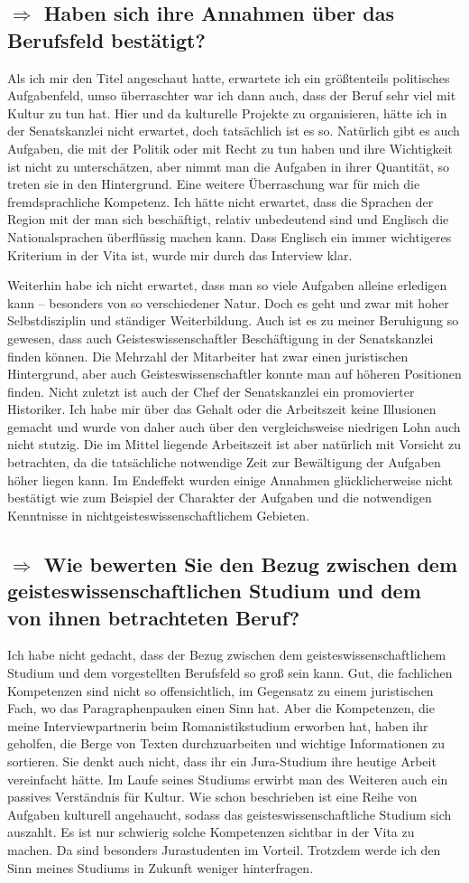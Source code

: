 \documentclass{../../sem_paper}
\newcommand\quest[1]{\subsection*{$\Rightarrow$ #1}}
\begin{document}
\quest{Haben sich ihre Annahmen über das Berufsfeld bestätigt?}
Als ich mir den Titel angeschaut hatte, erwartete ich ein größtenteils politisches Aufgabenfeld, umso überraschter war ich dann auch, dass der Beruf sehr viel mit Kultur zu tun hat. Hier und da kulturelle Projekte zu organisieren, hätte ich in der Senatskanzlei nicht erwartet, doch tatsächlich ist es so. Natürlich gibt es auch Aufgaben, die mit der Politik oder mit Recht zu tun haben und ihre Wichtigkeit ist nicht zu  unterschätzen, aber nimmt man die Aufgaben in ihrer Quantität, so treten sie in den Hintergrund.
Eine weitere Überraschung war für mich die fremdsprachliche Kompetenz. Ich hätte nicht erwartet, dass die Sprachen der Region mit der man sich beschäftigt, relativ unbedeutend sind und Englisch die Nationalsprachen überflüssig machen kann. Dass Englisch ein immer wichtigeres Kriterium in der Vita ist, wurde mir durch das Interview klar.

Weiterhin habe ich nicht erwartet, dass man so viele Aufgaben alleine erledigen kann -- besonders von so verschiedener Natur. Doch es geht und zwar mit hoher Selbstdisziplin und ständiger Weiterbildung. 
Auch ist es zu meiner Beruhigung so gewesen, dass auch Geisteswissenschaftler Beschäftigung in der Senatskanzlei finden können. Die Mehrzahl der Mitarbeiter hat zwar einen juristischen Hintergrund, aber auch Geisteswissenschaftler konnte man auf höheren Positionen finden. Nicht zuletzt ist auch der Chef der Senatskanzlei ein promovierter Historiker.
Ich habe mir über das Gehalt oder die Arbeitszeit keine Illusionen gemacht und wurde von daher auch über den vergleichsweise niedrigen Lohn auch  nicht stutzig. Die im Mittel liegende Arbeitszeit ist aber natürlich mit Vorsicht zu betrachten, da die tatsächliche notwendige Zeit zur Bewältigung der Aufgaben höher liegen kann.
Im Endeffekt wurden einige Annahmen glücklicherweise nicht bestätigt wie zum Beispiel der Charakter der Aufgaben und die notwendigen Kenntnisse in nichtgeisteswissenschaftlichem Gebieten.

\quest{Wie bewerten Sie den Bezug zwischen dem geisteswissenschaftlichen Studium und dem von ihnen betrachteten Beruf?}
Ich habe nicht gedacht, dass der Bezug zwischen dem geisteswissenschaftlichem Studium und dem vorgestellten Berufsfeld so groß sein kann. Gut, die fachlichen Kompetenzen sind nicht so offensichtlich, im Gegensatz zu einem juristischen Fach, wo das Paragraphenpauken einen Sinn hat. Aber die  Kompetenzen, die meine Interviewpartnerin beim Romanistikstudium erworben hat, haben ihr geholfen, die Berge von Texten durchzuarbeiten und wichtige Informationen zu sortieren. Sie denkt auch nicht, dass ihr ein Jura-Studium ihre heutige Arbeit vereinfacht hätte.
Im Laufe seines Studiums erwirbt man des Weiteren auch ein passives Verständnis für Kultur. Wie schon beschrieben ist eine Reihe von Aufgaben kulturell angehaucht, sodass das geisteswissenschaftliche Studium sich auszahlt.
Es ist nur schwierig solche Kompetenzen sichtbar in der Vita zu machen. Da sind besonders Jurastudenten im Vorteil. Trotzdem werde ich den Sinn meines Studiums in Zukunft weniger hinterfragen.
\end{document}
